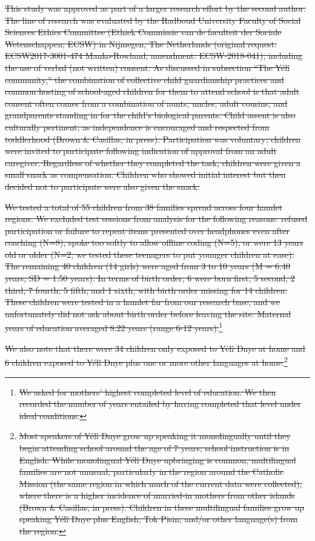 \documentclass[english,,man,floatsintext]{apa6} %
\providecommand{\DIFdeltex}[1]{{\protect\color{red}\sout{#1}}}                      %
\providecommand{\DIFdel}[1]{\texorpdfstring{\DIFdeltex{#1}}{}} %
\begin{document}
\DIFdel{This study was approved as part of a larger research effort by the second author. The line of research was evaluated by the Radboud University Faculty of Social Sciences Ethics Committee (Ethiek Commissie van de faculteit der Sociale Wetenschappen; ECSW) in Nijmegen, The Netherlands (original request: ECSW2017-3001-474 Manko-Rowland; amendment: ECSW-2018-041), including the use of verbal (not written) consent. As discussed in subsection ``The Yélî community,'' the combination of collective child guardianship practices and common hosting of school-aged children for them to attend school is that adult consent often comes from a combination of aunts, uncles, adult cousins, and grandparents standing in for the child's biological parents. Child assent is also culturally pertinent, as independence is encouraged and respected from toddlerhood (Brown \& Casillas, in press). Participation was voluntary; children were invited to participate following indication of approval from an adult caregiver. Regardless of whether they completed the task, children were given a small snack as compensation. Children who showed initial interest but then decided not to participate were also given the snack.
}%

\DIFdel{We tested a total of 55 children from 38 families spread across four hamlet regions. We excluded test sessions from analysis for the following reasons: refused participation or failure to repeat items presented over headphones even after coaching (N=8), spoke too softly to allow offline coding (N=5), or were 13 years old or older (N=2; we tested these teenagers to put younger children at ease). The remaining 40 children (14 girls) were aged from 3 to 10 years (M = 6.40 years, SD = 1.50 years). In terms of birth order, 6 were born first, 5 second, 2 third, 7 fourth, 5 fifth, and 1 sixth, with birth order missing for 14 children. These children were tested in a hamlet far from our research base, and we unfortunately did not ask about birth order before leaving the site. Maternal years of education averaged 8.22 years (range 6-12 years).}\footnote{\DIFdel{We asked for mothers' highest completed level of education. We then recorded the number of years entailed by having completed that level under ideal conditions.}} %
\addtocounter{footnote}{-1}%
\DIFdel{We also note that there were 34 children only exposed to Yélî Dnye at home and 6 children exposed to Yélî Dnye plus one or more other languages at home.}\footnote{\DIFdel{Most speakers of Yélî Dnye grow up speaking it monolingually until they begin attending school around the age of 7 years; school instruction is in English. While monolingual Yélî Dnye upbringing is common, multilingual families are not unusual, particularly in the region around the Catholic Mission (the same region in which much of the current data were collected), where there is a higher incidence of married-in mothers from other islands (Brown \& Casillas, in press). Children in these multilingual families grow up speaking Yélî Dnye plus English, Tok Pisin, and/or other language(s) from the region.}}
\addtocounter{footnote}{-1}%
\end{document}
